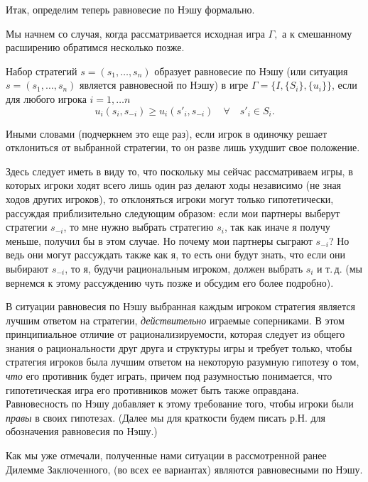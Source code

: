 Итак, определим теперь равновесие по Нэшу формально.

Мы начнем со случая, когда рассматривается исходная игра $\Gamma,$ а
к смешанному расширению обратимся несколько позже.

\begin{definition}
Набор стратегий $s=(s_1,\ldots,s_n)$ образует  равновесие по Нэшу
(или ситуация $s=(s_1,\ldots,s_n)$ является равновесной по Нэшу) в
игре $\Gamma=\{I,\{S_i\},\{u_i\}\}$, если для любого игрока
$i=1,\ldots n$
$$
u_i(s_i,s_{-i})\ge u_i(s'_i,s_{-i})\quad\forall\quad s'_i\in S_i.
$$
\end{definition}

Иными словами (подчеркнем это еще раз), если игрок в одиночку решает
отклониться от выбранной стратегии, то он разве лишь ухудшит свое
положение.

Здесь следует иметь в виду то, что поскольку мы сейчас рассматриваем
игры, в которых игроки ходят всего лишь один раз делают ходы
независимо (не зная ходов других игроков), то отклоняться игроки
могут только гипотетически, рассуждая приблизительно следующим
образом: если мои партнеры выберут стратегии $s_{-i}$, то мне нужно
выбрать стратегию $s_i$, так как иначе я получу меньше, получил бы в
этом случае. Но почему мои партнеры сыграют $s_{-i}$? Но ведь они
могут рассуждать также как я, то есть они будут знать, что если они
выбирают $s_{-i}$, то я, будучи рациональным игроком, должен выбрать
$s_i$ и т.\,д. (мы вернемся к этому рассуждению чуть позже и обсудим
его более подробно).

В ситуации равновесия по Нэшу выбранная каждым игроком стратегия
является лучшим ответом на стратегии, {\it  действительно} играемые
соперниками. В этом принципиальное отличие от рационализируемости,
которая следует из общего знания о рациональности друг друга и
структуры игры и требует только, чтобы стратегия игроков была лучшим
ответом на некоторую разумную гипотезу о том, \emph{что} его
противник будет играть, причем под разумностью понимается, что
гипотетическая игра его противников может быть также оправдана.
Равновесность по Нэшу добавляет к этому требование того, чтобы
игроки были {\it правы}  в своих гипотезах. (Далее мы для краткости
будем писать р.Н. для обозначения равновесия по Нэшу.)

Как мы уже отмечали, полученные нами ситуации в рассмотренной ранее
Дилемме Заключенного, (во всех ее вариантах) являются равновесными
по Нэшу.
\smallskip

